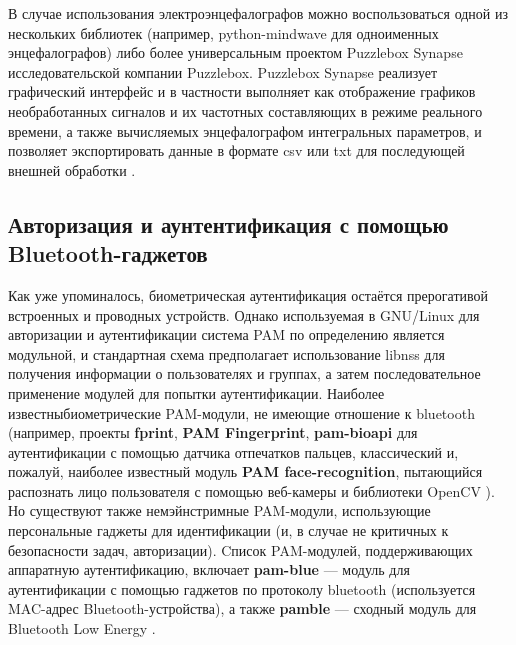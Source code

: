 \documentclass[10pt, a5paper]{article}
\begin{document}
В случае использования электроэнцефалографов можно воспользоваться одной из нескольких библиотек (например, \linebreak python-mindwave для одноименных энцефалографов) либо более универсальным проектом Puzzlebox Synapse исследовательской  компании Puzzlebox. Puzzlebox Synapse реализует графический интерфейс и в частности выполняет как отображение графиков необработанных сигналов и их частотных составляющих в режиме реального времени, а также вычисляемых энцефалографом интегральных параметров, и позволяет экспортировать данные в формате csv или txt для последующей внешней обработки \cite{bib8}.

\subsection*{Авторизация и аунтентификация с помощью \\ Bluetooth-гаджетов}

Как уже упоминалось, биометрическая аутентификация остаётся прерогативой встроенных и проводных устройств. Однако используемая в GNU/Linux для авторизации и аутентификации система PAM по определению является модульной, и стандартная схема предполагает использование libnss для получения информации о пользователях и группах, а затем последовательное применение модулей для попытки аутентификации. Наиболее известныбиометрические PAM-модули, не имеющие отношение к bluetooth (например, проекты \textbf{fprint}, \textbf{PAM Fingerprint}, \textbf{pam-bioapi} для аутентификации с помощью датчика отпечатков пальцев, классический и, пожалуй, наиболее известный модуль \textbf{PAM face-recognition}, пытающийся распознать лицо пользователя с помощью веб-камеры и библиотеки OpenCV \cite{bib9}). Но существуют также немэйнстримные PAM-модули, использующие персональные гаджеты для идентификации (и, в случае не критичных к безопасности задач, авторизации). Cписок PAM-модулей, поддерживающих аппаратную аутентификацию, включает \textbf{pam-blue} --- модуль для аутентификации с помощью гаджетов по протоколу bluetooth \cite{bib10} (используется MAC-адрес Bluetooth-устройства), а также \textbf{pamble} --- сходный модуль для Bluetooth Low Energy \cite{bib11}.
\end{document}
